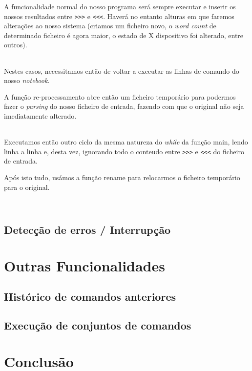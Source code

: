 \documentclass[11pt,a4paper]{report}
\begin{document}
A funcionalidade normal do nosso programa será sempre executar e inserir os nossos resultados entre \verb|>>>| e \verb|<<<|.
Haverá no entanto alturas em que faremos alterações ao nosso sistema (criamos um ficheiro novo, o \textit{word count} de determinado ficheiro é agora maior, o estado de X dispositivo foi alterado, entre outros). 


~\\

Nestes casos, necessitamos então de voltar a executar as linhas de comando do nosso \textit{notebook}.

A função re-processamento abre então um ficheiro temporário para podermos fazer o \textit{parsing} do nosso ficheiro de entrada, fazendo com que o original não seja imediatamente alterado.


~\\

Executamos então outro ciclo da mesma natureza do \textit{while} da função main, lendo linha a linha e, desta vez, ignorando todo o conteudo entre \verb|>>>| e \verb|<<<| do ficheiro de entrada.

Após isto tudo, usámos a função rename para relocarmos o ficheiro temporário para o original.


~\\





\section{Detecção de erros / Interrupção}


\chapter{Outras Funcionalidades}
\section{Histórico de comandos anteriores}
\section{Execução de conjuntos de comandos}



\chapter{Conclusão}
\end{document}
